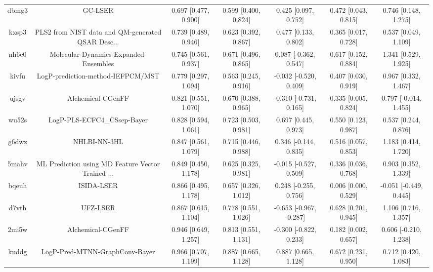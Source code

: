 \documentclass{article}
\begin{document}
\begin{center}
\begin{longtable}{|ccccccc|}
 dbmg3 &                                            GC-LSER &  0.697 [0.477, 0.900] &  0.599 [0.400, 0.824] &     0.425 [0.097, 0.752] &  0.472 [0.043, 0.815] &    0.746 [0.148, 1.275] \\
 kxsp3 &  PLS2 from NIST data and QM-generated QSAR Desc... &  0.739 [0.489, 0.946] &  0.623 [0.392, 0.867] &     0.477 [0.133, 0.802] &  0.365 [0.017, 0.728] &    0.537 [0.049, 1.109] \\
 nh6c0 &              Molecular-Dynamics-Expanded-Ensembles &  0.745 [0.561, 0.937] &  0.671 [0.496, 0.865] &    0.087 [-0.362, 0.547] &  0.617 [0.152, 0.884] &    1.341 [0.529, 1.925] \\
 kivfu &                  LogP-prediction-method-IEFPCM/MST &  0.779 [0.297, 1.094] &  0.563 [0.245, 0.916] &   -0.032 [-0.520, 0.409] &  0.407 [0.030, 0.919] &    0.967 [0.332, 1.467] \\
 ujsgv &                                  Alchemical-CGenFF &  0.821 [0.551, 1.070] &  0.670 [0.388, 0.965] &   -0.310 [-0.731, 0.165] &  0.335 [0.005, 0.824] &   0.797 [-0.014, 1.455] \\
 wu52s &                        LogP-PLS-ECFC4\_CSsep-Bayer &  0.828 [0.594, 1.061] &  0.723 [0.503, 0.981] &     0.697 [0.445, 0.973] &  0.550 [0.123, 0.987] &    0.537 [0.244, 0.876] \\
 g6dwz &                                       NHLBI-NN-3HL &  0.847 [0.561, 1.079] &  0.715 [0.446, 0.988] &    0.346 [-0.144, 0.835] &  0.516 [0.057, 0.853] &    1.183 [0.414, 1.720] \\
 5mahv &  ML Prediction using MD Feature Vector Trained ... &  0.849 [0.450, 1.178] &  0.625 [0.325, 0.981] &   -0.015 [-0.527, 0.509] &  0.336 [0.036, 0.768] &    0.903 [0.352, 1.339] \\
 bqeuh &                                         ISIDA-LSER &  0.866 [0.495, 1.178] &  0.657 [0.326, 1.012] &    0.248 [-0.255, 0.756] &  0.006 [0.000, 0.529] &  -0.051 [-0.449, 0.445] \\
 d7vth &                                           UFZ-LSER &  0.867 [0.615, 1.104] &  0.778 [0.551, 1.026] &  -0.653 [-0.967, -0.287] &  0.628 [0.201, 0.945] &    1.106 [0.716, 1.357] \\
 2mi5w &                                  Alchemical-CGenFF &  0.946 [0.649, 1.257] &  0.813 [0.551, 1.131] &   -0.300 [-0.822, 0.233] &  0.182 [0.002, 0.657] &   0.606 [-0.210, 1.238] \\
 kuddg &                     LogP-Pred-MTNN-GraphConv-Bayer &  0.966 [0.707, 1.199] &  0.887 [0.665, 1.128] &     0.887 [0.665, 1.128] &  0.672 [0.231, 0.950] &    0.712 [0.420, 1.083] \\

\end{longtable}
\end{center}
\end{document}
